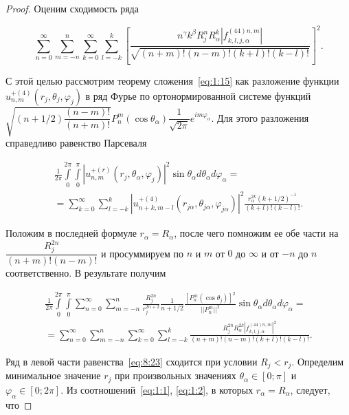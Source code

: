 \begin{proof}
Оценим сходимость ряда

\begin{equation}
\sum\limits_{n = 0}^\infty  {\sum\limits_{m =  - n}^n {\sum\limits_{k = 0}^\infty  {\sum\limits_{l =  - k}^k {{{\left[ {\frac{{{n^\gamma }{k^\beta }R_j^nR_\alpha^k\left| {f_{k,l,j,\alpha}^{(44)n,m}} \right|}}{{\sqrt {(n + m)!(n - m)!(k + l)!(k - l)!} }}} \right]}^2}}}}}.
\label{eq:8:24}
\end{equation}

С этой целью рассмотрим теорему сложения~\eqref{eq:1:15} как разложение функции $u_{n,m}^{+(4)}(r_j,\theta_j,\varphi_j)$ в ряд Фурье по ортонормированной системе функций $\sqrt {(n + 1/2)\dfrac{{(n - m)!}}{{(n + m)!}}} P_n^m(\cos {\theta _\alpha})\dfrac{1}{{\sqrt {2\pi } }}{e^{im{\varphi _\alpha}}}$. Для этого разложения справедливо равенство Парсеваля

\begin{multline}
\frac{1}{{2\pi }}\int\limits_0^{2\pi } {\int\limits_0^\pi  {{{\left| {u_{n,m}^{ + (r)}\left( {{r_j},{\theta _\alpha},{\varphi _j}} \right)} \right|}^2}} } \sin {\theta _\alpha}d{\theta _\alpha}d{\varphi _\alpha} = \\
= \sum\limits_{k = 0}^\infty  {\sum\limits_{l =  - k}^k {{{\left| {u_{n + k,m - l}^{ + (4)}\left( {{r_{j\alpha}},{\theta _{j\alpha}},{\varphi _{j\alpha}}} \right)} \right|}^2}} } \frac{{r_\alpha^{2k}{{\left( {k + 1/2} \right)}^{ - 1}}}}{{(k + l)!(k - l)!}}.
\end{multline}

Положим в последней формуле $r_\alpha=R_\alpha$, после чего помножим ее обе части на $\dfrac{R_j^{2n}}{(n+m)!(n-m)!}$ и просуммируем по $n$ и $m$ от $0$ до $\infty$ и от $-n$ до $n$ соответственно. В результате получим

\begin{multline}
\frac{1}{{2\pi }}\int\limits_0^{2\pi } {\int\limits_0^\pi  {\sum\limits_{n = 0}^\infty  {\sum\limits_{m =  - n}^n {\frac{{R_j^{2n}}}{{r_j^{2n + 2}}}} } } } \frac{1}{{n + 1/2}}\frac{{{{\left[ {P_n^m(\cos {\theta _j})} \right]}^2}}}{{||P_n^m|{|^2}}}\sin {\theta _\alpha}d{\theta _\alpha}d{\varphi _\alpha} = \\
= \sum\limits_{n = 0}^\infty  {\sum\limits_{m =  - n}^n {\sum\limits_{k = 0}^\infty  {\sum\limits_{l =  - k}^k {\frac{{R_j^{2n}R_\alpha^{2k}{{\left| {f_{k,l,j,\alpha}^{(44)n,m}} \right|}^2}}}{{(n + m)!(n - m)!(k + l)!(k - l)!}}} } } }.
\label{eq:8:23}
\end{multline}

Ряд в левой части равенства~\eqref{eq:8:23} сходится при условии $R_j<r_j$. Определим минимальное значение $r_j$ при произвольных значениях $\theta_\alpha\in[0;\pi]$ и $\varphi_\alpha\in[0;2\pi]$. Из соотношений~\eqref{eq:1:1}, \eqref{eq:1:2}, в которых $r_\alpha=R_\alpha$, следует, что


\end{proof}
